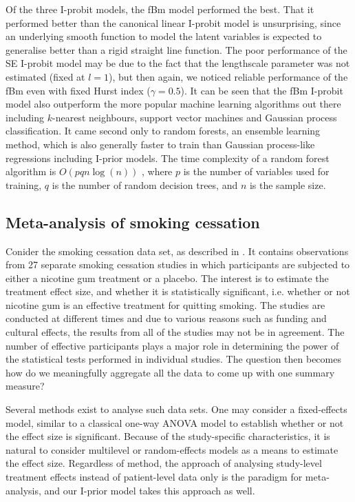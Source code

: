 \documentclass[showframe,11pt]{report}\usepackage[]{graphicx}\usepackage{xcolor}
\begin{document}
Of the three I-probit models, the fBm model performed the best.
That it performed better than the canonical linear I-probit model is unsurprising, since an underlying smooth function to model the latent variables is expected to generalise better than a rigid straight line function.
The poor performance of the SE I-probit model may be due to the fact that the lengthscale parameter was not estimated (fixed at $l=1$), but then again, we noticed reliable performance of the fBm even with fixed Hurst index ($\gamma = 0.5$).
It can be seen that the fBm I-probit model also outperform the more popular machine learning algorithms out there including $k$-nearest neighbours, support vector machines and Gaussian process classification.
It came second only to random forests, an ensemble learning method, which is also generally faster to train than Gaussian process-like regressions including I-prior models.
The time complexity of a random forest algorithm is $O(pqn\log(n))$ \citep{louppe2014understanding}, where $p$ is the number of variables used for training, $q$ is the number of random decision trees, and $n$ is the sample size.

\subsection{Meta-analysis of smoking cessation}

Conider the smoking cessation data set, as described in \citet{skrondal2004generalized}.
It contains observations from 27 separate smoking cessation studies in which participants are subjected to either a nicotine gum treatment or a placebo.
The interest is to estimate the treatment effect size, and whether it is statistically significant, i.e. whether or not nicotine gum is an effective treatment for quitting smoking.
The studies are conducted at different times and due to various reasons such as funding and cultural effects, the results from all of the studies may not be in agreement.
The number of effective participants plays a major role in determining the power of the statistical tests performed in individual studies.
The question then becomes how do we meaningfully aggregate all the data to come up with one summary measure?

Several methods exist to analyse such data sets.
One may consider a fixed-effects model, similar to a classical one-way ANOVA model to establish whether or not the effect size is significant.
Because of the study-specific characteristics, it is natural to consider multilevel or random-effects models as a means to estimate the effect size.
Regardless of method, the approach of analysing study-level treatment effects instead of patient-level data only is the paradigm for meta-analysis, and our I-prior model takes this approach as well.
\end{document}
